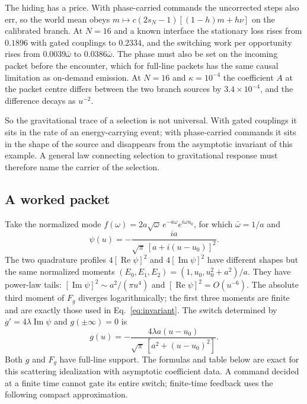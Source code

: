The hiding has a price. With phase-carried commands the uncorrected steps also err, so the world mean obeys $m\mapsto c(2s_N-1)[(1-h)m+h\nu]$ on the calibrated branch. At $N=16$ and a known interface the stationary loss rises from $0.1896$ with gated couplings to $0.2334$, and the switching work per opportunity rises from $0.0039\bar\omega$ to $0.0386\bar\omega$. The phase must also be set on the incoming packet before the encounter, which for full-line packets has the same causal limitation as on-demand emission. At $N=16$ and $\kappa=10^{-4}$ the coefficient $A$ at the packet centre differs between the two branch sources by $3.4\times10^{-4}$, and the difference decays as $u^{-2}$.

So the gravitational trace of a selection is not universal. With gated couplings it sits in the rate of an energy-carrying event; with phase-carried commands it sits in the shape of the source and disappears from the asymptotic invariant of this example. A general law connecting selection to gravitational response must therefore name the carrier of the selection.


\subsection{A worked packet}
\label{sec:packet}

Take the normalized mode $f(\omega)=2a\sqrt\omega\,e^{-a\omega}e^{i\omega u_0}$, for which $\bar\omega=1/a$ and
\begin{equation}
\psi(u)=-\frac{ia}{\sqrt\pi\,[a+i(u-u_0)]^2}.
\end{equation}
The two quadrature profiles $4[\operatorname{Re}\psi]^2$ and $4[\operatorname{Im}\psi]^2$ have different shapes but the same normalized moments $(E_0,E_1,E_2)=(1,u_0,u_0^2+a^2)/a$. They have power-law tails: $[\operatorname{Im}\psi]^2\sim a^2/(\pi u^4)$ and $[\operatorname{Re}\psi]^2=O(u^{-6})$. The absolute third moment of $F_g$ diverges logarithmically; the first three moments are finite and are exactly those used in Eq.~\eqref{eq:invariant}. The switch determined by $g'=4\lambda\operatorname{Im}\psi$ and $g(\pm\infty)=0$ is
\begin{equation}
 g(u)=-\frac{4\lambda a(u-u_0)}{\sqrt\pi\,[a^2+(u-u_0)^2]}.
 \label{eq:exact-switch}
\end{equation}
Both $g$ and $F_g$ have full-line support. The formulas and table below are exact
for this scattering idealization with asymptotic coefficient data. A command decided
at a finite time cannot gate its entire switch; finite-time feedback uses the
following compact approximation.


